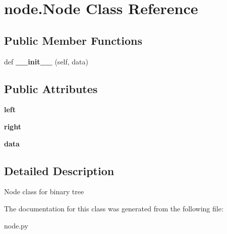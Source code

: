 \hypertarget{classnode_1_1Node}{}\section{node.\+Node Class Reference}
\label{classnode_1_1Node}
\subsection*{Public Member Functions}
\begin{DoxyCompactItemize}
\item 
\mbox{\label{classnode_1_1Node_a49efb04d7d108b751064dbb8815f8f1b}} 
def {\bfseries \+\_\+\+\_\+init\+\_\+\+\_\+} (self, data)
\end{DoxyCompactItemize}
\subsection*{Public Attributes}
\begin{DoxyCompactItemize}
\item 
\mbox{\label{classnode_1_1Node_aa1caf7104381c17c8eef64feecba8980}} 
{\bfseries left}
\item 
\mbox{\label{classnode_1_1Node_a19b985553662bfd3d1eaa009d7bb6af3}} 
{\bfseries right}
\item 
\mbox{\label{classnode_1_1Node_aa357f0c11267a6352c53fe6af60fa06e}} 
{\bfseries data}
\end{DoxyCompactItemize}


\subsection{Detailed Description}
\begin{DoxyVerb}Node class for binary tree \end{DoxyVerb}
 

The documentation for this class was generated from the following file\+:\begin{DoxyCompactItemize}
\item 
node.\+py\end{DoxyCompactItemize}
